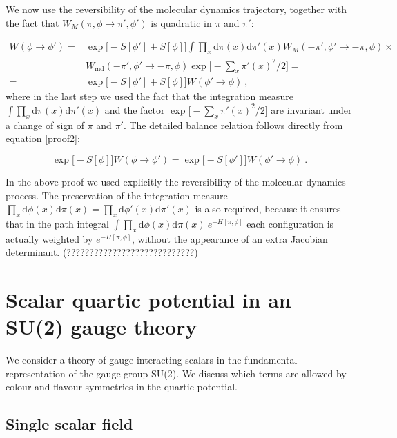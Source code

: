 We now use the  reversibility of the molecular dynamics trajectory, together with the fact that $W_M(\pi,\phi \to \pi',\phi')$ is quadratic in $\pi$ and $\pi'$:

\begin{equation}
\begin{split}
W(\phi \to \phi') = & \exp \bigl[ - S[\phi'] + S[\phi] \bigr] \int \prod_{x} \mathrm{d} \pi(x) \mathrm{d} \pi'(x) W_M(-\pi',\phi' \to -\pi,\phi) \times \\
& W_{\mathrm{md}}(-\pi',\phi' \to -\pi,\phi) \exp \bigl[ -\sum_x \pi'(x)^2 /2 \bigr] = \\
= &  \exp \bigl[ - S[\phi'] + S[\phi] \bigr] W(\phi' \to \phi) \: ,
\end{split}
\label{proof2}
\end{equation}
%
where in the last step we used the fact that the integration measure $ \int \prod_{x} \mathrm{d} \pi(x) \mathrm{d} \pi'(x)$ and the factor $\exp \bigl[ -\sum_x \pi'(x)^2 /2 \bigr]$ are invariant under a change of sign of $\pi$ and $\pi'$. The detailed balance relation follows directly from equation \ref{proof2}:

\begin{equation}
\exp \bigl[ -  S[\phi] \bigr]W(\phi \to \phi') =\exp \bigl[ - S[\phi'] \bigr] W(\phi' \to \phi) \: .
\end{equation}

In the above proof we used explicitly the reversibility of the molecular dynamics process. The preservation of the integration measure $ \prod_{x} \mathrm{d} \phi(x) \mathrm{d} \pi(x) =  \prod_{x} \mathrm{d} \phi'(x) \mathrm{d} \pi'(x)$ is also required, because it ensures that in the path integral  $\int \prod_{x} \mathrm{d} \phi(x) \mathrm{d} \pi(x) \: e^{-H[\pi,\phi]}$ each configuration is actually weighted by $e^{-H[\pi,\phi]}$, without the appearance of an extra Jacobian determinant. (????????????????????????????)


\section{Scalar quartic potential in an SU(2) gauge theory}
\label{app_quartic_potential}

We consider a theory of gauge-interacting scalars in the fundamental representation of the gauge group SU(2). We discuss which terms are allowed by colour and flavour symmetries in the quartic potential.

\subsection{Single scalar field}


